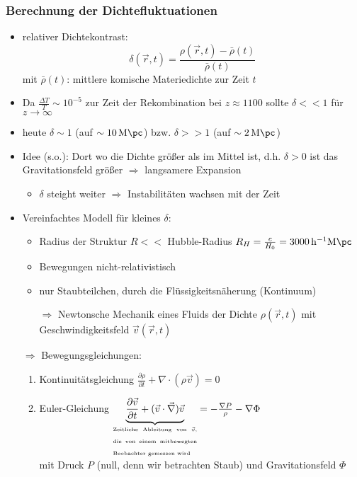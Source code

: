 \subsubsection{Berechnung der Dichtefluktuationen}
\begin{itemize}
	\item relativer Dichtekontrast:
		\begin{equation*}
			\delta(\vec{r},t)=\frac{\rho(\vec{r},t)-\bar{\rho}(t)}{\bar{\rho}(t)}
		\end{equation*}
		mit $\bar{\rho}(t)$: mittlere komische Materiedichte zur Zeit $t$
	\item Da $\frac{\Delta T}{T}\sim 10^{-5}$ zur Zeit der Rekombination bei $z\approx\num{1100}$ sollte $\delta << 1$ für $z\to\infty$
	\item heute $\delta\sim 1$ (auf $\sim\SI{10}{M\pc}$) bzw. $\delta >> 1$ (auf $\sim\SI{2}{M\pc}$)
	\item Idee (s.o.): Dort wo die Dichte größer als im Mittel ist, d.h. $\delta>0$ ist das Gravitationsfeld größer $\Rightarrow$ langsamere Expansion
		\begin{itemize}
			\item $\delta$ steight weiter $\Rightarrow$ Instabilitäten wachsen mit der Zeit
		\end{itemize}
	\item Vereinfachtes Modell für kleines $\delta$:
		\begin{itemize}[label={$\cdot$}]
			\item Radius der Struktur $R<<$ Hubble-Radius $R_H=\frac{c}{H_0}=\SI{3000}{h^{-1}M\pc}$
			\item Bewegungen nicht-relativistisch
			\item nur Staubteilchen, durch die Flüssigkeitsnäherung (Kontinuum)
			\item[$\Rightarrow$] Newtonsche Mechanik eines Fluids der Dichte $\rho(\vec{r},t)$ mit Geschwindigkeitsfeld $\vec{v}(\vec{r},t)$
		\end{itemize}
	\item[$\Rightarrow$] Bewegungsgleichungen:
		\begin{enumerate}[label={(\arabic*)}]
			\item Kontinuitätsgleichung $\frac{\partial\rho}{\partial t}+\nabla\cdot(\rho\vec{v})=0$
			\item Euler-Gleichung $\underset{\begin{minipage}{3cm}\begin{tiny}Zeitliche Ableitung von $\vec{v}$, die von einem mitbewegten Beobachter gemessen wird\end{tiny}\end{minipage}}{\underbrace{\frac{\partial\vec{v}}{\partial t}+(\vec{v}\cdot\vec{\nabla})\vec{v}}}=-\frac{\nabla P\tikz[remember picture]{\coordinate (Druck) at (0,0);}}{\rho}-\nabla\Phi$\\
				mit Druck $P$ (null, denn wir betrachten Staub) und Gravitationsfeld $\Phi$
		\end{enumerate}
\end{itemize}
